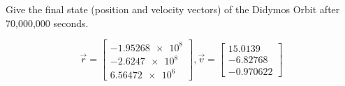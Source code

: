 \begin{hwkProblem}{4}{}

	Give the final state (position and velocity vectors) of the Didymos Orbit after 70,000,000 seconds.

	\hwkSol

	\hwkPart

	\[
		\vec{r} = \begin{bmatrix}
				\num{-1.95268e8} \\
				\num{-2.6247e8} \\
				\num{6.56472e6}
			\end{bmatrix},
		\vec{v} = \begin{bmatrix}
				\num{15.0139} \\
				\num{-6.82768} \\
				\num{-0.970622}
			\end{bmatrix}
	\]

	\hwkPart
	
	

\end{hwkProblem}



